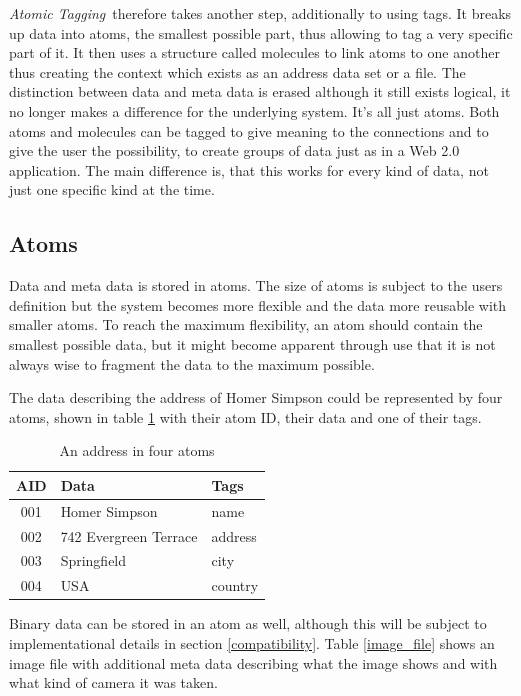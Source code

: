 \documentclass[12pt,a4paper,notitlepage,twocolumn,oneside]{article}
\newcommand{\at}{{\emph{Atomic Tagging}}}
\begin{document}
\at\ therefore takes another step, additionally to using tags. It breaks up data into atoms, the smallest possible part, thus allowing to tag a very specific part of it. It then uses a structure called molecules to link atoms to one another thus creating the context which exists as an address data set or a file. The distinction between data and meta data is erased although it still exists logical, it no longer makes a difference for the underlying system. It's all just atoms. Both atoms and molecules can be tagged to give meaning to the connections and to give the user the possibility, to create groups of data just as in a Web 2.0 application. The main difference is, that this works for every kind of data, not just one specific kind at the time.

\subsection{Atoms}\label{atoms}
Data and meta data is stored in atoms. The size of atoms is subject to the users definition but the system becomes more flexible and the data more reusable with smaller atoms. To reach the maximum flexibility, an atom should contain the smallest possible data, but it might become apparent through use that it is not always wise to fragment the data to the maximum possible. 

The data describing the address of Homer Simpson could be represented by four atoms, shown in table \ref{homer_simpson} with their atom ID, their data and one of their tags.

\begin{table}[htp]
\centering
\begin{tabular}{|c|l|l|}
\hline
\textbf{AID} & \textbf{Data} & \textbf{Tags} \\
\hline
001 & Homer Simpson & name \\
002 & 742 Evergreen Terrace & address \\
003 & Springfield & city \\
004 & USA & country \\
\hline
\end{tabular}
\caption{An address in four atoms}
\label{homer_simpson}
\end{table}

Binary data can be stored in an atom as well, although this will be subject to implementational details in section \ref{compatibility}. Table \ref{image_file} shows an image file with additional meta data describing what the image shows and with what kind of camera it was taken.
\end{document}
